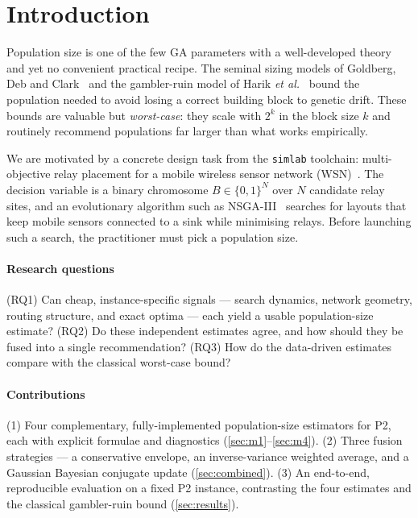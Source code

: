 \documentclass[conference]{IEEEtran}
\begin{document}
\section{Introduction}
\label{sec:intro}
Population size is one of the few GA parameters with a well-developed theory and
yet no convenient practical recipe. The seminal sizing models of Goldberg,
Deb and Clark~\cite{goldberg1992sizing} and the gambler-ruin model of Harik
\emph{et al.}~\cite{harik1999gambler} bound the population needed to avoid losing
a correct building block to genetic drift. These bounds are valuable but
\emph{worst-case}: they scale with $2^{k}$ in the block size $k$ and routinely
recommend populations far larger than what works empirically.

We are motivated by a concrete design task from the \texttt{simlab} toolchain:
multi-objective relay placement for a mobile wireless sensor network
(WSN)~\cite{akyildiz2002survey,younis2008placement}. The decision variable is a
binary chromosome $B\in\{0,1\}^{N}$ over $N$ candidate relay sites, and an
evolutionary algorithm such as NSGA-III~\cite{deb2014nsga3} searches for layouts
that keep mobile sensors connected to a sink while minimising relays. Before
launching such a search, the practitioner must pick a population size.

\paragraph*{Research questions}
(RQ1) Can cheap, instance-specific signals --- search dynamics, network
geometry, routing structure, and exact optima --- each yield a usable
population-size estimate? (RQ2) Do these independent estimates agree, and how
should they be fused into a single recommendation? (RQ3) How do the data-driven
estimates compare with the classical worst-case bound?

\paragraph*{Contributions}
(1) Four complementary, fully-implemented population-size estimators for P2,
each with explicit formulae and diagnostics
(\autoref{sec:m1}--\autoref{sec:m4}). (2) Three fusion strategies --- a
conservative envelope, an inverse-variance weighted average, and a Gaussian
Bayesian conjugate update (\autoref{sec:combined}). (3) An end-to-end,
reproducible evaluation on a fixed P2 instance, contrasting the four estimates
and the classical gambler-ruin bound (\autoref{sec:results}).
\end{document}
